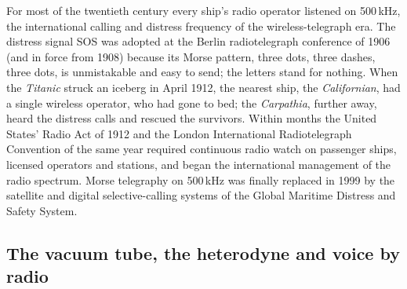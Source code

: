 

\begin{inpractice}
For most of the twentieth century every ship's radio operator listened on 500\,kHz, the international
calling and distress frequency of the wireless-telegraph era. The distress signal SOS was adopted at
the Berlin radiotelegraph conference of 1906 (and in force from 1908) because its Morse pattern, three
dots, three dashes, three dots, is unmistakable and easy to send; the letters stand for nothing.
When the \emph{Titanic} struck an iceberg in April 1912, the nearest ship, the \emph{Californian}, had a
single wireless operator, who had gone to bed; the \emph{Carpathia}, further away, heard the
distress calls and rescued the survivors. Within months the United States' Radio Act of 1912 and the
London International Radiotelegraph Convention of the same year required continuous radio watch on
passenger ships, licensed operators and stations, and began the international management of the
radio spectrum. Morse telegraphy on 500\,kHz was finally replaced in 1999 by the satellite and digital
selective-calling systems of the Global Maritime Distress and Safety System.
\end{inpractice}


\subsection{The vacuum tube, the heterodyne and voice by radio}

